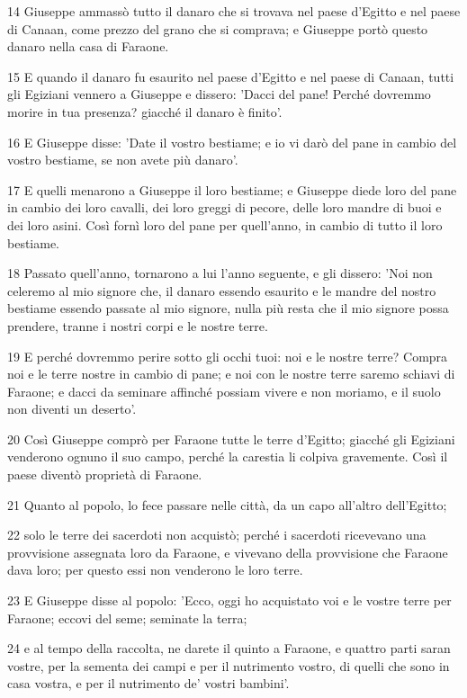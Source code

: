 \par 14 Giuseppe ammassò tutto il danaro che si trovava nel paese d'Egitto e nel paese di Canaan, come prezzo del grano che si comprava; e Giuseppe portò questo danaro nella casa di Faraone.
\par 15 E quando il danaro fu esaurito nel paese d'Egitto e nel paese di Canaan, tutti gli Egiziani vennero a Giuseppe e dissero: 'Dacci del pane! Perché dovremmo morire in tua presenza? giacché il danaro è finito'.
\par 16 E Giuseppe disse: 'Date il vostro bestiame; e io vi darò del pane in cambio del vostro bestiame, se non avete più danaro'.
\par 17 E quelli menarono a Giuseppe il loro bestiame; e Giuseppe diede loro del pane in cambio dei loro cavalli, dei loro greggi di pecore, delle loro mandre di buoi e dei loro asini. Così fornì loro del pane per quell'anno, in cambio di tutto il loro bestiame.
\par 18 Passato quell'anno, tornarono a lui l'anno seguente, e gli dissero: 'Noi non celeremo al mio signore che, il danaro essendo esaurito e le mandre del nostro bestiame essendo passate al mio signore, nulla più resta che il mio signore possa prendere, tranne i nostri corpi e le nostre terre.
\par 19 E perché dovremmo perire sotto gli occhi tuoi: noi e le nostre terre? Compra noi e le terre nostre in cambio di pane; e noi con le nostre terre saremo schiavi di Faraone; e dacci da seminare affinché possiam vivere e non moriamo, e il suolo non diventi un deserto'.
\par 20 Così Giuseppe comprò per Faraone tutte le terre d'Egitto; giacché gli Egiziani venderono ognuno il suo campo, perché la carestia li colpiva gravemente. Così il paese diventò proprietà di Faraone.
\par 21 Quanto al popolo, lo fece passare nelle città, da un capo all'altro dell'Egitto;
\par 22 solo le terre dei sacerdoti non acquistò; perché i sacerdoti ricevevano una provvisione assegnata loro da Faraone, e vivevano della provvisione che Faraone dava loro; per questo essi non venderono le loro terre.
\par 23 E Giuseppe disse al popolo: 'Ecco, oggi ho acquistato voi e le vostre terre per Faraone; eccovi del seme; seminate la terra;
\par 24 e al tempo della raccolta, ne darete il quinto a Faraone, e quattro parti saran vostre, per la sementa dei campi e per il nutrimento vostro, di quelli che sono in casa vostra, e per il nutrimento de' vostri bambini'.
